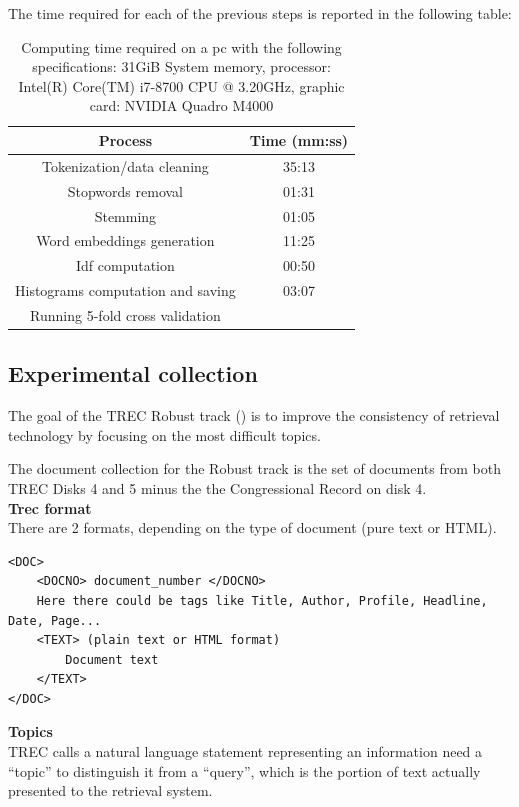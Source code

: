 The time required for each of the previous steps is reported in the following table:

\begin{table}[h!]
\centering
 \begin{tabular}{cc} 
 \hline
 Process & Time (mm:ss) \\
 \hline
 Tokenization/data cleaning & 35:13 \\
 Stopwords removal & 01:31 \\
 Stemming & 01:05 \\
 Word embeddings generation & 11:25 \\
 Idf computation & 00:50 \\
 Histograms computation and saving & 03:07 \\
 Running 5-fold cross validation \\
 \hline
 \end{tabular}
 \caption{Computing time required on a pc with the following specifications: 31GiB System memory, processor: Intel(R) Core(TM) i7-8700 CPU @ 3.20GHz, graphic card: NVIDIA Quadro M4000}
 \label{table:timeit}
\end{table}

\subsection{Experimental collection}

The goal of the TREC Robust track (\cite{rob04}) is to improve the consistency of retrieval
technology by focusing on the most difficult topics.

The document collection for the Robust track is the set of documents from both TREC Disks 4 and 5 minus the the Congressional Record on disk 4.\\

\textbf{Trec format}\\

There are 2 formats, depending on the type of document (pure text or HTML).\\

\begin{lstlisting}
<DOC>
	<DOCNO> document_number </DOCNO>
	Here there could be tags like Title, Author, Profile, Headline, Date, Page...
	<TEXT> (plain text or HTML format)
		Document text
	</TEXT>
</DOC>
\end{lstlisting}

\textbf{Topics}\\

TREC calls a natural language statement representing an information need a ``topic'' to distinguish it from a ``query'', which is the portion of text actually presented to the retrieval system.

